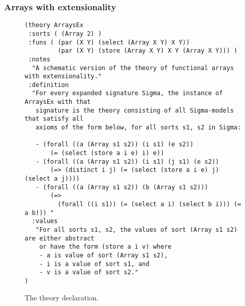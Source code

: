 \subsubsection*{Arrays with extensionality}

\begin{figure}[h]
\small
{\color{NavyBlue}
\begin{verbatim}
(theory ArraysEx
 :sorts ( (Array 2) )
 :funs ( (par (X Y) (select (Array X Y) X Y))
         (par (X Y) (store (Array X Y) X Y (Array X Y))) )
 :notes
  "A schematic version of the theory of functional arrays with extensionality."
 :definition
  "For every expanded signature Sigma, the instance of ArraysEx with that
   signature is the theory consisting of all Sigma-models that satisfy all 
   axioms of the form below, for all sorts s1, s2 in Sigma:
  
   - (forall ((a (Array s1 s2)) (i s1) (e s2))
       (= (select (store a i e) i) e))
   - (forall ((a (Array s1 s2)) (i s1) (j s1) (e s2))
       (=> (distinct i j) (= (select (store a i e) j) (select a j))))
   - (forall ((a (Array s1 s2)) (b (Array s1 s2)))
       (=> 
         (forall ((i s1)) (= (select a i) (select b i))) (= a b))) "
  :values
   "For all sorts s1, s2, the values of sort (Array s1 s2) are either abstract 
    or have the form (store a i v) where
    - a is value of sort (Array s1 s2),
    - i is a value of sort s1, and 
    - v is a value of sort s2."
)
\end{verbatim}
}%
%
%
\caption{The  theory declaration.}
\label{fig:ArraysEx}
\end{figure}

